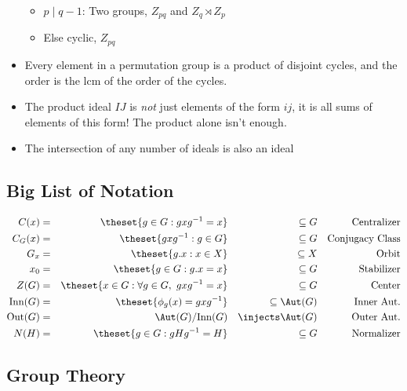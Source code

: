 \begin{itemize}
  \begin{itemize}
  \tightlist
  \item
    \(p \mid q-1\): Two groups, \(Z_{pq}\) and \(Z_q \rtimes Z_p\)
  \item
    Else cyclic, \(Z_{pq}\)
  \end{itemize}
\item
  Every element in a permutation group is a product of disjoint cycles,
  and the order is the lcm of the order of the cycles.
\item
  The product ideal \(IJ\) is \emph{not} just elements of the form
  \(ij\), it is all sums of elements of this form! The product alone
  isn't enough.
\item
  The intersection of any number of ideals is also an ideal
\end{itemize}

\hypertarget{big-list-of-notation}{%
\subsection{Big List of Notation}\label{big-list-of-notation}}

\begin{align*}
C(x)            = && \theset{g\in G : gxg^{-1} = x}                 && \subseteq G          && \text{Centralizer} \\
C_G(x)          = && \theset{gxg^{-1} : g\in G}                     && \subseteq G          && \text{Conjugacy Class} \\
G_x             = && \theset{g.x : x\in X}                          && \subseteq X          && \text{Orbit} \\
x_0             = && \theset{g\in G : g.x = x}                      && \subseteq G          && \text{Stabilizer} \\
Z(G)            = && \theset{x\in G: \forall g\in G,~ gxg^{-1} = x} && \subseteq G          && \text{Center} \\
\mathrm{Inn}(G) = && \theset{\phi_g(x) = gxg^{-1} }                 && \subseteq \Aut(G)    && \text{Inner Aut.} \\
\mathrm{Out}(G) = && \Aut(G) / \mathrm{Inn}(G)                      && \injects \Aut(G)     && \text{Outer Aut.} \\
N(H)            = && \theset{g\in G: gHg^{-1} = H}                  && \subseteq G          && \text{Normalizer}
\end{align*}

\hypertarget{group-theory}{%
\subsection{Group Theory}\label{group-theory}}

